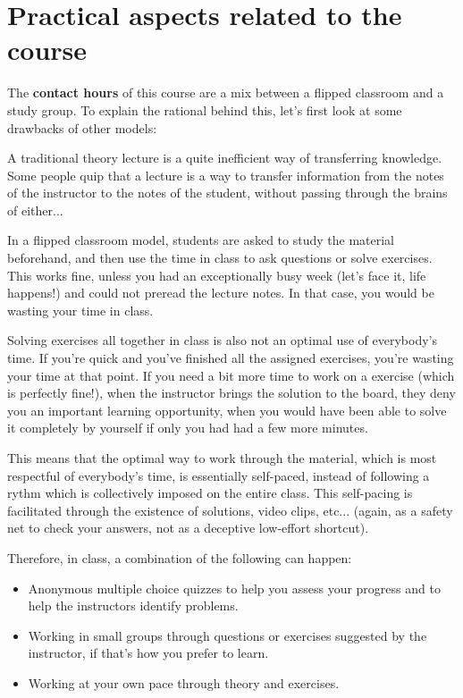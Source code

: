 \chapter{Practical aspects related to the course}

The \textbf{contact hours} of this course are a mix between a flipped classroom and a study group. To explain the rational behind this, let's first look at some drawbacks of other models:

A traditional theory lecture is a quite inefficient way of transferring knowledge. Some people quip that a lecture is a way to transfer information from the notes of the instructor to the notes of the student, without passing through the brains of either...

In a flipped classroom model, students are asked to study the material beforehand, and then use the time in class to ask questions or solve exercises. This works fine, unless you had an exceptionally busy week (let's face it, life happens!) and could not preread the lecture notes. In that case, you would be wasting your time in class.

Solving exercises all together in class is also not an optimal use of everybody's time. If you're quick and you've finished all the assigned exercises, you're wasting your time at that point. If you need a bit more time to work on a exercise (which is perfectly fine!), when the instructor brings the solution to the board, they deny you an important learning opportunity, when you would have been able to solve it completely by yourself if only you had had a few more minutes.

This means that the optimal way to work through the material, which is most respectful of everybody's time, is essentially self-paced, instead of following a rythm which is collectively imposed on the entire class. This self-pacing is facilitated through the existence of solutions, video clips, etc... (again, as a safety net to check your answers, not as a deceptive low-effort shortcut).

Therefore, in class, a combination of the following can happen:

\begin{itemize}
\item Anonymous multiple choice quizzes to help you assess your progress and to help the instructors identify problems.
\item Working in small groups through questions or exercises suggested by the instructor, if that's how you prefer to learn.
\item Working at your own pace through theory and exercises.   
\end{itemize}

